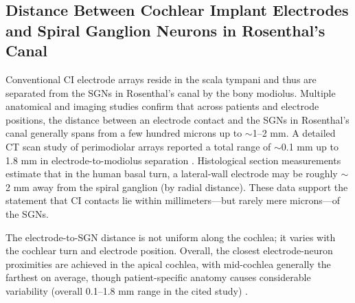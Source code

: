 \subsection{Distance Between Cochlear Implant Electrodes and Spiral Ganglion Neurons in Rosenthal’s Canal}
Conventional CI electrode arrays reside in the scala tympani and thus are separated from the SGNs in Rosenthal’s canal by the bony modiolus. Multiple anatomical and imaging studies confirm that across patients and electrode positions, the distance between an electrode contact and the SGNs in Rosenthal’s canal generally spans from a few hundred microns up to $\sim$1–2 mm. A detailed CT scan study of perimodiolar arrays reported a total range of $\sim$0.1 mm up to 1.8 mm in electrode-to-modiolus separation \cite{Long2014}. Histological section measurements estimate that in the human basal turn, a lateral-wall electrode may be roughly $\sim$2 mm away from the spiral ganglion (by radial distance). These data support the statement that CI contacts lie within millimeters—but rarely mere microns—of the SGNs\cite{Schmidbauer2023}.

The electrode-to-SGN distance is not uniform along the cochlea; it varies with the cochlear turn and electrode position. Overall, the closest electrode-neuron proximities are achieved in the apical cochlea, with mid-cochlea generally the farthest on average, though patient-specific anatomy causes considerable variability (overall 0.1--1.8 mm range in the cited study) \cite{Long2014}.

